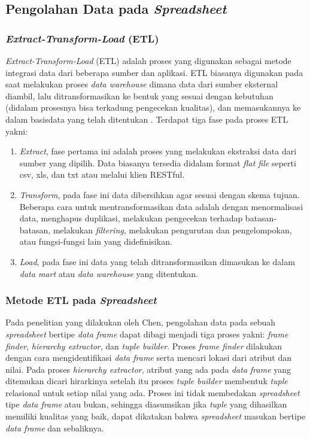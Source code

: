 \subsection{Pengolahan Data pada \textit{Spreadsheet}}
    \subsubsection{\textit{Extract-Transform-Load} (ETL)}
    \textit{Extract-Transform-Load} (ETL) adalah proses yang digunakan sebagai metode integrasi data dari beberapa sumber dan aplikasi. ETL biasanya digunakan pada saat melakukan proses \textit{data warehouse} dimana data dari sumber eksternal diambil, lalu ditransformasikan ke bentuk yang sesuai dengan kebutuhan (didalam prosesnya bisa terkadung pengecekan kualitas), dan memasukannya ke dalam basisdata yang telah ditentukan \parencite{Bansal2014}. Terdapat tiga fase pada proses ETL yakni:

    \begin{enumerate}
        \item \textit{Extract}, fase pertama ini adalah proses yang melakukan ekstraksi data dari sumber yang dipilih. Data biasanya tersedia didalam format \textit{flat file} seperti csv, xls, dan txt atau melalui klien RESTful.
        \item \textit{Transform}, pada fase ini data dibersihkan agar sesuai dengan skema tujuan. Beberapa cara untuk mentransformasikan data adalah dengan menormalisasi data, menghapus duplikasi, melakukan pengecekan terhadap batasan-batasan, melakukan \textit{filtering}, melakukan pengurutan dan pengelompokan, atau fungsi-fungsi lain yang didefinisikan.
        \item \textit{Load}, pada fase ini data yang telah ditransformasikan dimasukan ke dalam \textit{data mart} atau \textit{data warehouse} yang ditentukan.
    \end{enumerate}

    \subsubsection{Metode ETL pada \textit{Spreadsheet}}
    Pada penelitian yang dilakukan oleh Chen, pengolahan data pada sebuah \textit{spreadsheet} bertipe \textit{data frame} dapat dibagi menjadi tiga proses yakni: \textit{frame finder}, \textit{hierarchy extractor}, dan \textit{tuple builder}. Proses \textit{frame finder} dilakukan dengan cara mengidentifikasi \textit{data frame} serta mencari lokasi dari atribut dan nilai. Pada proses \textit{hierarchy extractor}, atribut yang ada pada \textit{data frame} yang ditemukan dicari hirarkinya setelah itu proses \textit{tuple builder} membentuk \textit{tuple} relasional untuk setiap nilai yang ada. Proses ini tidak membedakan \textit{spreadsheet} tipe \textit{data frame} atau bukan, sehingga diasumsikan jika \textit{tuple} yang dihasilkan memiliki kualitas yang baik, dapat dikatakan bahwa \textit{spreadsheet} masukan bertipe \textit{data frame} dan sebaliknya. \parencite{Chen2013}

